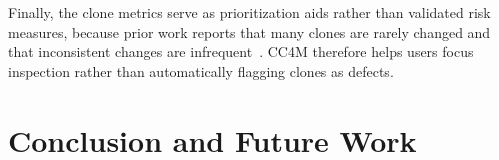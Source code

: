 \documentclass[conference]{IEEEtran}
\begin{document}
Finally, the clone metrics serve as prioritization aids rather than
validated risk measures, because prior work reports that many clones are
rarely changed and that inconsistent changes are infrequent~\cite{Goode2011}.
\textsc{CC4M} therefore helps users focus inspection rather than
automatically flagging clones as defects.

% 







\section{Conclusion and Future Work}

\end{document}
